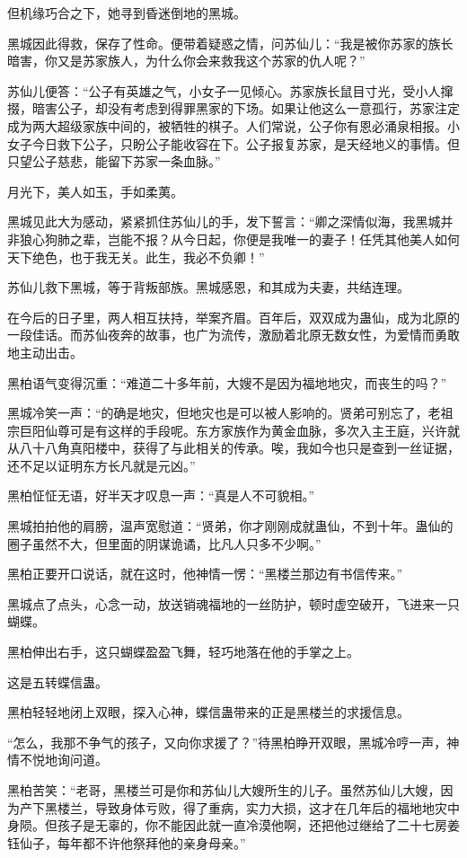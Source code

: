 \begin{this_body}
但机缘巧合之下，她寻到昏迷倒地的黑城。

黑城因此得救，保存了性命。便带着疑惑之情，问苏仙儿：“我是被你苏家的族长暗害，你又是苏家族人，为什么你会来救我这个苏家的仇人呢？”

苏仙儿便答：“公子有英雄之气，小女子一见倾心。苏家族长鼠目寸光，受小人撺掇，暗害公子，却没有考虑到得罪黑家的下场。如果让他这么一意孤行，苏家注定成为两大超级家族中间的，被牺牲的棋子。人们常说，公子你有恩必涌泉相报。小女子今日救下公子，只盼公子能收容在下。公子报复苏家，是天经地义的事情。但只望公子慈悲，能留下苏家一条血脉。”

月光下，美人如玉，手如柔荑。

黑城见此大为感动，紧紧抓住苏仙儿的手，发下誓言：“卿之深情似海，我黑城并非狼心狗肺之辈，岂能不报？从今日起，你便是我唯一的妻子！任凭其他美人如何天下绝色，也于我无关。此生，我必不负卿！”

苏仙儿救下黑城，等于背叛部族。黑城感恩，和其成为夫妻，共结连理。

在今后的日子里，两人相互扶持，举案齐眉。百年后，双双成为蛊仙，成为北原的一段佳话。而苏仙夜奔的故事，也广为流传，激励着北原无数女性，为爱情而勇敢地主动出击。

黑柏语气变得沉重：“难道二十多年前，大嫂不是因为福地地灾，而丧生的吗？”

黑城冷笑一声：“的确是地灾，但地灾也是可以被人影响的。贤弟可别忘了，老祖宗巨阳仙尊可是有这样的手段呢。东方家族作为黄金血脉，多次入主王庭，兴许就从八十八角真阳楼中，获得了与此相关的传承。唉，我如今也只是查到一丝证据，还不足以证明东方长凡就是元凶。”

黑柏怔怔无语，好半天才叹息一声：“真是人不可貌相。”

黑城拍拍他的肩膀，温声宽慰道：“贤弟，你才刚刚成就蛊仙，不到十年。蛊仙的圈子虽然不大，但里面的阴谋诡谲，比凡人只多不少啊。”

黑柏正要开口说话，就在这时，他神情一愣：“黑楼兰那边有书信传来。”

黑城点了点头，心念一动，放送销魂福地的一丝防护，顿时虚空破开，飞进来一只蝴蝶。

黑柏伸出右手，这只蝴蝶盈盈飞舞，轻巧地落在他的手掌之上。

这是五转蝶信蛊。

黑柏轻轻地闭上双眼，探入心神，蝶信蛊带来的正是黑楼兰的求援信息。

“怎么，我那不争气的孩子，又向你求援了？”待黑柏睁开双眼，黑城冷哼一声，神情不悦地询问道。

黑柏苦笑：“老哥，黑楼兰可是你和苏仙儿大嫂所生的儿子。虽然苏仙儿大嫂，因为产下黑楼兰，导致身体亏败，得了重病，实力大损，这才在几年后的福地地灾中身陨。但孩子是无辜的，你不能因此就一直冷漠他啊，还把他过继给了二十七房姜钰仙子，每年都不许他祭拜他的亲身母亲。”


\end{this_body}
